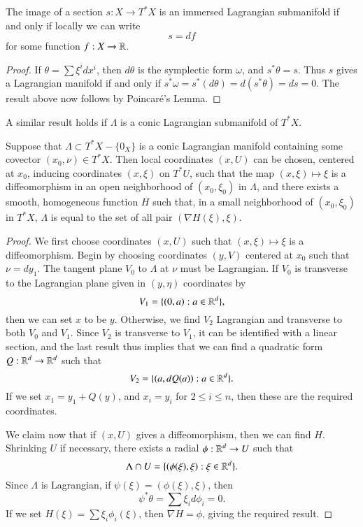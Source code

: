 \begin{lemma}
    The image of a section $s: X \to T^* X$ is an immersed Lagrangian submanifold if and only if locally we can write
    \[ s = d f \]
    for some function $f: X \to \operatorname{\mathbb{R}}$.
\end{lemma}
\begin{proof}
    If $\theta = \sum \xi^i dx^i$, then $d\theta$ is the symplectic form $\omega$, and $s^* \theta = s$. Thus $s$ gives a Lagrangian manifold if and only if $s^* \omega = s^*(d \theta) = d(s^* \theta) = ds = 0$. The result above now follows by Poincar\'{e}'s Lemma.
\end{proof}

A similar result holds if $\Lambda$ is a conic Lagrangian submanifold of $T^* X$.

\begin{lemma}
    Suppose that $\Lambda \subset T^* X - \{ 0_X \}$ is a conic Lagrangian manifold containing some covector $(x_0,\nu) \in T^* X$. Then local coordinates $(x,U)$ can be chosen, centered at $x_0$, inducing coordinates $(x,\xi)$ on $T^* U$, such that the map $(x,\xi) \mapsto \xi$ is a diffeomorphism in an open neighborhood of $(x_0,\xi_0)$ in $\Lambda$, and there exists a smooth, homogeneous function $H$ such that, in a small neighborhood of $(x_0,\xi_0)$ in $T^* X$, $\Lambda$ is equal to the set of all pair $(\nabla H(\xi), \xi)$.
\end{lemma}
\begin{proof}
    We first choose coordinates $(x,U)$ such that $(x,\xi) \mapsto \xi$ is a diffeomorphism. Begin by choosing coordinates $(y,V)$ centered at $x_0$ such that $\nu = dy_1$. The tangent plane $V_0$ to $\Lambda$ at $\nu$ must be Lagrangian. If $V_0$ is transverse to the Lagrangian plane given in $(y,\eta)$ coordinates by
    \[ V_1 = \{ (0,a) : a \in \operatorname{\mathbb{R}}^d \}, \]
    then we can set $x$ to be $y$. Otherwise, we find $V_2$ Lagrangian and transverse to both $V_0$ and $V_1$. Since $V_2$ is transverse to $V_1$, it can be identified with a linear section, and the last result thus implies that we can find a quadratic form $Q: \operatorname{\mathbb{R}}^d \to \operatorname{\mathbb{R}}^d$ such that 
    \[ V_2 = \{ (a,dQ(a)) : a \in \operatorname{\mathbb{R}}^d \}. \]
    If we set $x_1 = y_1 + Q(y)$, and $x_i = y_i$ for $2 \leq i \leq n$, then these are the required coordinates.

    We claim now that if $(x,U)$ gives a diffeomorphism, then we can find $H$. Shrinking $U$ if necessary, there exists a radial $\phi: \operatorname{\mathbb{R}}^d \to U$ such that
    \[ \Lambda \cap U = \{ (\phi(\xi), \xi) : \xi \in \operatorname{\mathbb{R}}^d \}. \]
    Since $\Lambda$ is Lagrangian, if $\psi(\xi) = (\phi(\xi),\xi)$, then
    \[ \psi^* \theta = \sum \xi_i d\phi_i = 0. \]
    If we set $H(\xi) = \sum \xi_i \phi_i(\xi)$, then $\nabla H = \phi$, giving the required result.
\end{proof}

